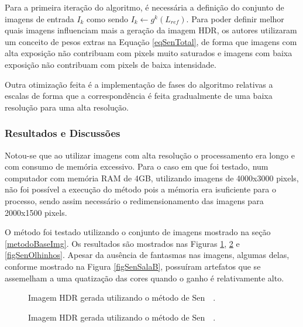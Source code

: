 Para a primeira iteração do algoritmo, é necessária a definição do conjunto de imagens de entrada ${I_k}$ como sendo $I_k \leftarrow g^k(L_{ref})$. Para poder definir melhor quais imagens influenciam mais a geração da imagem HDR, os autores utilizaram um conceito de pesos extras na Equação \ref{eqSenTotal}, de forma que imagens com alta exposição não contribuam com pixels muito saturados e imagens com baixa exposição não contribuam com pixels de baixa intensidade.

Outra otimização feita é a implementação de fases do algoritmo relativas a escalas de forma que a correspondência é feita gradualmente de uma baixa resolução para uma alta resolução.

\subsubsection{Resultados e Discussões} \label{MetodoSenResultado}

Notou-se que ao utilizar imagens com alta resolução o processamento era longo e com consumo de memória excessivo. Para o caso em que foi testado, num computador com memória RAM de 4GB, utilizando imagens de 4000x3000 pixels, não foi possível a execução do método pois a mémoria era isuficiente para o processo, sendo assim necessário o redimensionamento das imagens para 2000x1500 pixels.

O método foi testado utilizando o conjunto de imagens mostrado na seção \ref{metodoBaseImg}. Os resultados são mostrados nas Figuras \ref{figSenSala}, \ref{figSenPorquinho} e \ref{figSenOlhinhos}. Apesar da ausência de fantasmas nas imagens, algumas delas, conforme mostrado na Figura \ref{figSenSalaB}, possuíram artefatos que se assemelham a uma quatização das cores quando o ganho é relativamente alto.

\begin{figure}[H]
  \centering
  \quad %
  \caption{Imagem HDR gerada utilizando o método de Sen~\etal~\protect\cite{hdrMovimento}.}
  \label{figSenSala}
\end{figure}

\begin{figure}[H]
  \centering
  \quad %
  \caption{Imagem HDR gerada utilizando o método de Sen~\etal~\protect\cite{hdrMovimento}.}
  \label{figSenPorquinho}
\end{figure}


